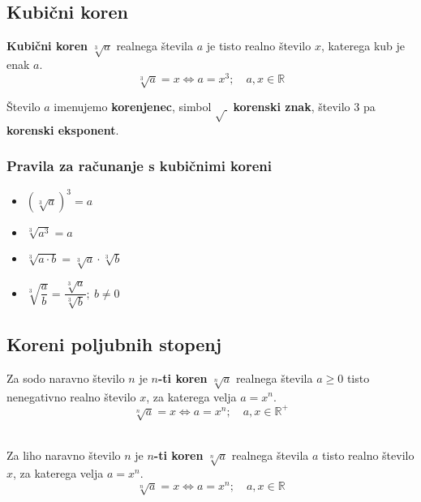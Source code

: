         

        
            \subsection{Kubični koren}

                \textbf{Kubični koren} $\sqrt[3]{a}$ realnega števila $a$ je tisto realno število $x$,
                katerega kub je enak $a$.
                $$\sqrt[3]{a}=x \Leftrightarrow a=x^3; \quad a,x\in\mathbb{R}$$

                Število $a$ imenujemo \textbf{korenjenec}, simbol $\sqrt{~}$ \textbf{korenski znak}, število $3$ pa \textbf{korenski eksponent}.
            

            \subsubsection*{Pravila za računanje s kubičnimi koreni}
                \begin{multicols}{2}
                    \begin{itemize}
                        \item $\left(\sqrt[3]{a}\right)^3=a$
                        \item $\sqrt[3]{a^3}=a$
                        \item $\sqrt[3]{a\cdot b}=\sqrt[3]{a}\cdot\sqrt[3]{b}$
                        \item $\sqrt[3]{\dfrac{a}{b}}=\dfrac{\sqrt[3]{a}}{\sqrt[3]{b}}; ~b\neq 0$
                    \end{itemize}
                \end{multicols}
                
            

        


        
            \subsection{Koreni poljubnih stopenj}

                Za sodo naravno število $n$ je \textbf{$n$-ti koren} $\sqrt[n]{a}$ realnega števila $a\geq 0$ tisto nenegativno realno število $x$,
                za katerega velja $a=x^n$.
                $$\displaystyle \sqrt[n]{a}=x \Leftrightarrow a=x^n; \quad a,x\in\mathbb{R}^+ $$
                ~
                
                Za liho naravno število $n$ je \textbf{$n$-ti koren} $\sqrt[n]{a}$ realnega števila $a$ tisto realno število $x$,
                za katerega velja $a=x^n$.
                $$\displaystyle \sqrt[n]{a}=x \Leftrightarrow a=x^n; \quad a,x\in\mathbb{R} $$
                ~
                

